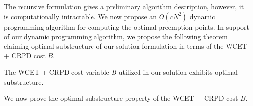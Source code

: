 \noindent
The recursive formulation gives a preliminary algorithm description, however, it is computationally intractable.  We now propose an \begin{math}O(cN^{2})\end{math} dynamic programming algorithm for computing the optimal preemption points.  In support of our dynamic programming algorithm, we propose the following theorem claiming optimal substructure of our solution formulation in terms of the WCET + CRPD cost $B$.

\begin{theorem}
\label{thm:optimal-substructure-cost}
The WCET + CRPD cost variable $B$ utilized in our solution exhibits optimal substructure.
\end{theorem}

\noindent
We now prove the optimal substructure property of the WCET + CRPD cost $B$.
\newline
\noindent
